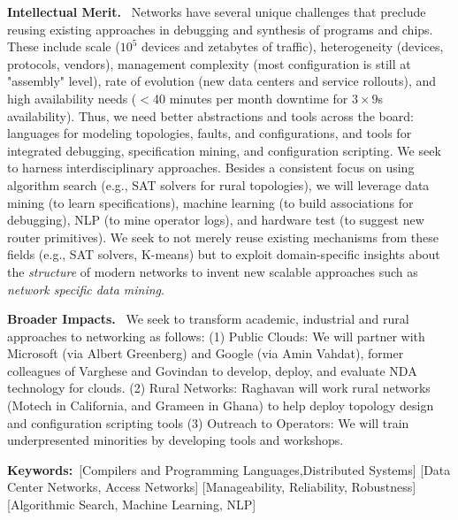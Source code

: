 \documentclass[10pt]{article}
\begin{document}
\smallskip
\noindent\textbf{Intellectual Merit.}~
%
Networks have several unique challenges that preclude reusing existing approaches
in debugging and synthesis of programs and chips. These include scale ($10^5$ devices and zetabytes of traffic), heterogeneity (devices, protocols, vendors), management complexity (most configuration is still at "assembly" level), rate of evolution (new data centers and service rollouts), and high availability needs ($<$40 minutes per month downtime for $3 \times 9$s availability). Thus, we need better abstractions and tools across the board: languages for modeling topologies, faults,  and configurations, and tools for integrated debugging, specification mining, and configuration scripting. We seek to harness interdisciplinary approaches.  Besides a consistent focus on using algorithm search (e.g., SAT solvers for rural topologies), we will leverage data mining (to learn specifications), machine learning (to build associations for debugging),  NLP (to mine operator logs), and hardware test (to suggest new router primitives).  We seek to not merely reuse existing
mechanisms from these fields (e.g., SAT solvers, K-means) but to exploit domain-specific insights about the \emph{structure} of modern networks to invent new scalable approaches such as \emph{network specific data mining}.

\smallskip
\noindent\textbf{Broader Impacts.}~
We seek to transform academic, industrial and rural approaches to networking as follows: (1) Public Clouds: We will partner with Microsoft (via Albert Greenberg) and Google (via Amin Vahdat), former colleagues of Varghese and Govindan to develop, deploy, and evaluate NDA technology for clouds. (2) Rural Networks: Raghavan will work rural networks (Motech in California, and Grameen in Ghana) to help deploy topology design and configuration scripting tools  (3) Outreach to Operators: We will train underpresented minorities by developing tools and workshops.

\smallskip
\noindent\textbf{Keywords:}~[Compilers and Programming Languages,Distributed Systems] [Data Center Networks, Access Networks] [Manageability, Reliability, Robustness] [Algorithmic Search, Machine Learning, NLP]
\end{document}
